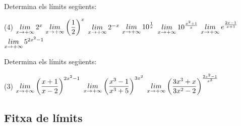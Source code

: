 \begin{mylist}
	
	
	\exer Determina els límits següents:
	\begin{tasks}(4)
		\task  $\mathop{lim}\limits_{x\to +\infty} 2^x$
		\task  $\mathop{lim}\limits_{x\to +\infty} \left(\dfrac{1}{2}\right)^x$
		\task  $\mathop{lim}\limits_{x\to +\infty} 2^{-x}$	
		\task  $\mathop{lim}\limits_{x\to +\infty} 10^{\frac{1}{x}}$
	    \task  $\mathop{lim}\limits_{x\to +\infty} 10^{\frac{x^2+1}{x}}$
		\task  $\mathop{lim}\limits_{x\to +\infty} e^{\frac{2x-1}{x+1}}$
		\task  $\mathop{lim}\limits_{x\to +\infty} 5^{2x^2-1}$			
	\end{tasks}	
	
	\exer Determina els límits següents:
		\begin{tasks}(3) 
		\task  $\mathop{lim}\limits_{x\to +\infty} \left( \dfrac{x+1 }{x-2 } \right) ^{2x^2-1}$
		\task  $\mathop{lim}\limits_{x\to +\infty} \left( \dfrac{x^3-1 }{x^3+5 } \right) ^{3x^2}$
		\task  $\mathop{lim}\limits_{x\to +\infty} \left( \dfrac{3x^3+x }{3x^2-2 } \right) ^{\frac{2x^2-1}{x^3}}$
      	\end{tasks}
      \answers{[$+\infty$, $1$, $1$]}
	
\end{mylist}


\subsection{Fitxa de límits}

